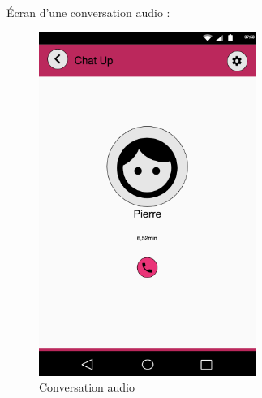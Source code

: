 Écran d’une conversation audio :

	\begin{figure}[H]
		\centering \includegraphics[scale=0.5]{img/audio.png}
		\caption{Conversation audio}
	\end{figure}
